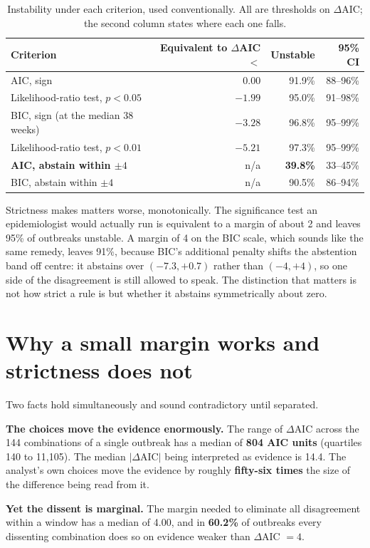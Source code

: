 \documentclass[11pt,a4paper]{article}
\begin{document}
\begin{table}[htbp]
\centering
\caption{Instability under each criterion, used conventionally. All are thresholds
on $\Delta$AIC; the second column states where each one falls.}
\begin{tabular}{lrrr}
\toprule
Criterion & Equivalent to $\Delta$AIC $<$ & Unstable & 95\% CI \\
\midrule
AIC, sign & $0.00$ & 91.9\% & 88--96\% \\
Likelihood-ratio test, $p<0.05$ & $-1.99$ & 95.0\% & 91--98\% \\
BIC, sign (at the median 38 weeks) & $-3.28$ & 96.8\% & 95--99\% \\
Likelihood-ratio test, $p<0.01$ & $-5.21$ & 97.3\% & 95--99\% \\
\midrule
\textbf{AIC, abstain within $\pm 4$} & n/a & \textbf{39.8\%} & 33--45\% \\
BIC, abstain within $\pm 4$ & n/a & 90.5\% & 86--94\% \\
\bottomrule
\end{tabular}
\end{table}

Strictness makes matters worse, monotonically. The significance test an
epidemiologist would actually run is equivalent to a margin of about 2 and leaves
95\% of outbreaks unstable. A margin of 4 on the BIC scale, which sounds like the
same remedy, leaves 91\%, because BIC's additional penalty shifts the abstention
band off centre: it abstains over $(-7.3, +0.7)$ rather than $(-4, +4)$, so one
side of the disagreement is still allowed to speak. The distinction that matters
is not how strict a rule is but whether it abstains symmetrically about zero.

\section{Why a small margin works and strictness does not}

Two facts hold simultaneously and sound contradictory until separated.

\textbf{The choices move the evidence enormously.} The range of $\Delta$AIC across
the 144 combinations of a single outbreak has a median of \textbf{804 AIC units}
(quartiles 140 to 11{,}105). The median $|\Delta\mathrm{AIC}|$ being interpreted as
evidence is 14.4. The analyst's own choices move the evidence by roughly
\textbf{fifty-six times} the size of the difference being read from it.

\textbf{Yet the dissent is marginal.} The margin needed to eliminate all
disagreement within a window has a median of 4.00, and in \textbf{60.2\%} of
outbreaks every dissenting combination does so on evidence weaker than
$\Delta$AIC $= 4$.
\end{document}
